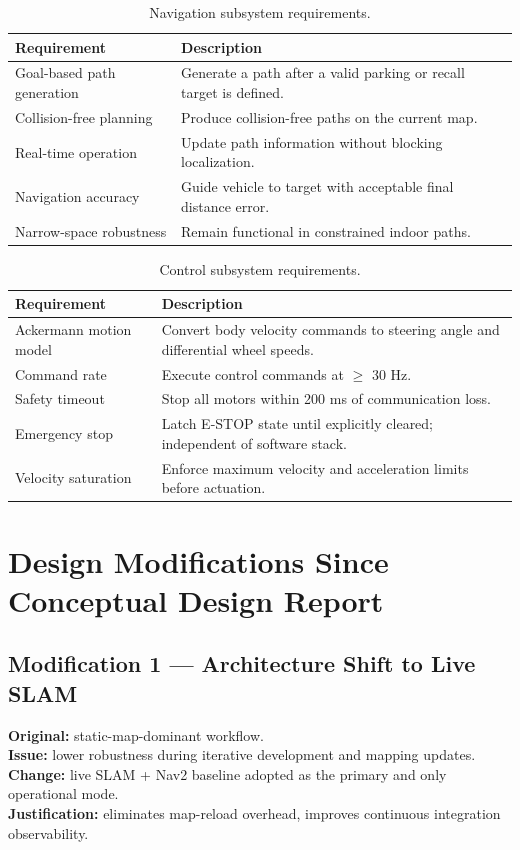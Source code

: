 \documentclass[12pt,a4paper]{report}
\begin{document}
\begin{table}[H]
\centering
\caption{Navigation subsystem requirements.}
\label{tab:nav_req}
\begin{tabularx}{\textwidth}{|p{4cm}|X|}
\hline
\textbf{Requirement} & \textbf{Description} \\
\hline
Goal-based path generation & Generate a path after a valid parking or recall target is defined. \\
\hline
Collision-free planning & Produce collision-free paths on the current map. \\
\hline
Real-time operation & Update path information without blocking localization. \\
\hline
Navigation accuracy & Guide vehicle to target with acceptable final distance error. \\
\hline
Narrow-space robustness & Remain functional in constrained indoor paths. \\
\hline
\end{tabularx}
\end{table}

\begin{table}[H]
\centering
\caption{Control subsystem requirements.}
\label{tab:ctrl_req}
\begin{tabularx}{\textwidth}{|p{4cm}|X|}
\hline
\textbf{Requirement} & \textbf{Description} \\
\hline
Ackermann motion model & Convert body velocity commands to steering angle and differential wheel speeds. \\
\hline
Command rate & Execute control commands at $\geq$ 30 Hz. \\
\hline
Safety timeout & Stop all motors within 200 ms of communication loss. \\
\hline
Emergency stop & Latch E-STOP state until explicitly cleared; independent of software stack. \\
\hline
Velocity saturation & Enforce maximum velocity and acceleration limits before actuation. \\
\hline
\end{tabularx}
\end{table}

\section{Design Modifications Since Conceptual Design Report}

\subsection{Modification 1 --- Architecture Shift to Live SLAM}
\textbf{Original:} static-map-dominant workflow.\\
\textbf{Issue:} lower robustness during iterative development and mapping updates.\\
\textbf{Change:} live SLAM + Nav2 baseline adopted as the primary and only operational mode.\\
\textbf{Justification:} eliminates map-reload overhead, improves continuous integration observability.
\end{document}
